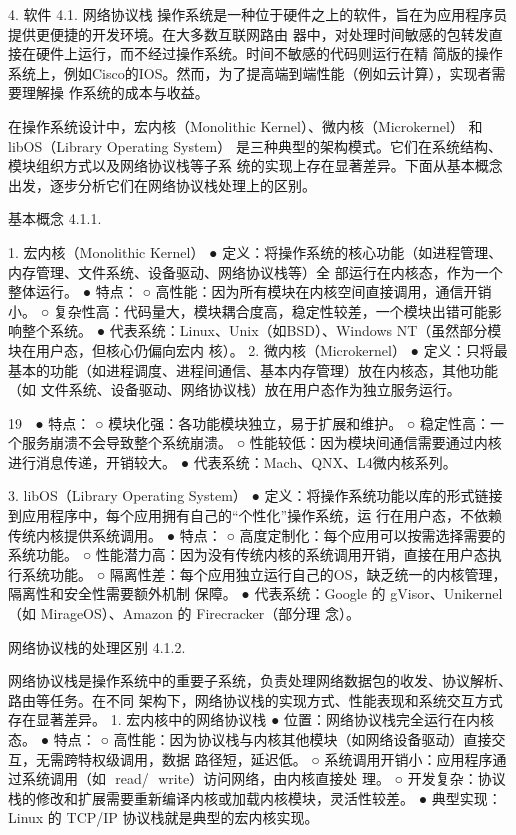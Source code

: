 4.   软件
4.1.   网络协议栈
操作系统是一种位于硬件之上的软件，旨在为应用程序员提供更便捷的开发环境。在大多数互联网路由
器中，对处理时间敏感的包转发直接在硬件上运行，而不经过操作系统。时间不敏感的代码则运行在精
简版的操作系统上，例如Cisco的IOS。然而，为了提高端到端性能（例如云计算），实现者需要理解操
作系统的成本与收益。

在操作系统设计中，宏内核（Monolithic Kernel）、微内核（Microkernel） 和 libOS（Library
Operating System） 是三种典型的架构模式。它们在系统结构、模块组织方式以及网络协议栈等子系
统的实现上存在显著差异。下面从基本概念出发，逐步分析它们在网络协议栈处理上的区别。

     基本概念
4.1.1.

1. 宏内核（Monolithic Kernel）
  ● 定义：将操作系统的核心功能（如进程管理、内存管理、文件系统、设备驱动、网络协议栈等）全
    部运行在内核态，作为一个整体运行。
  ● 特点：
     ○ 高性能：因为所有模块在内核空间直接调用，通信开销小。
     ○ 复杂性高：代码量大，模块耦合度高，稳定性较差，一个模块出错可能影响整个系统。
  ● 代表系统：Linux、Unix（如BSD）、Windows NT（虽然部分模块在用户态，但核心仍偏向宏内
    核）。
2. 微内核（Microkernel）
  ● 定义：只将最基本的功能（如进程调度、进程间通信、基本内存管理）放在内核态，其他功能（如
    文件系统、设备驱动、网络协议栈）放在用户态作为独立服务运行。

                                                               19
  ●  特点：
       ○ 模块化强：各功能模块独立，易于扩展和维护。
       ○ 稳定性高：一个服务崩溃不会导致整个系统崩溃。
       ○ 性能较低：因为模块间通信需要通过内核进行消息传递，开销较大。
  ● 代表系统：Mach、QNX、L4微内核系列。

3. libOS（Library Operating System）
  ● 定义：将操作系统功能以库的形式链接到应用程序中，每个应用拥有自己的“个性化”操作系统，运
     行在用户态，不依赖传统内核提供系统调用。
  ● 特点：
       ○ 高度定制化：每个应用可以按需选择需要的系统功能。
       ○ 性能潜力高：因为没有传统内核的系统调用开销，直接在用户态执行系统功能。
       ○ 隔离性差：每个应用独立运行自己的OS，缺乏统一的内核管理，隔离性和安全性需要额外机制
         保障。
  ● 代表系统：Google 的 gVisor、Unikernel（如 MirageOS）、Amazon 的 Firecracker（部分理
     念）。

     网络协议栈的处理区别
4.1.2.

网络协议栈是操作系统中的重要子系统，负责处理网络数据包的收发、协议解析、路由等任务。在不同
架构下，网络协议栈的实现方式、性能表现和系统交互方式存在显著差异。
1. 宏内核中的网络协议栈
  ● 位置：网络协议栈完全运行在内核态。
  ● 特点：
     ○ 高性能：因为协议栈与内核其他模块（如网络设备驱动）直接交互，无需跨特权级调用，数据
       路径短，延迟低。
     ○ 系统调用开销小：应用程序通过系统调用（如 ﻿     read﻿/ ﻿
                                         write﻿）访问网络，由内核直接处
       理。
     ○ 开发复杂：协议栈的修改和扩展需要重新编译内核或加载内核模块，灵活性较差。
  ● 典型实现：Linux 的 TCP/IP 协议栈就是典型的宏内核实现。

